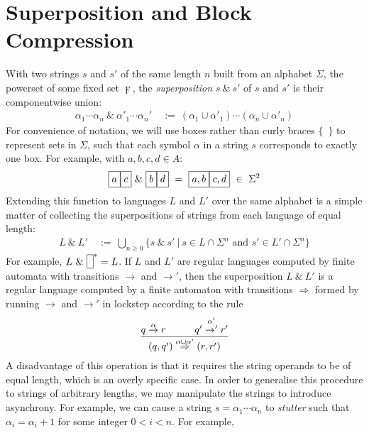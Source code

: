 \documentclass[a4paper,11pt]{article}
\newcommand{\vph}[1]{\vphantom{#1}}
\newcommand{\sta}[2]{\stackrel{#1}{#2}}
\begin{document}
\section{Superposition and Block Compression}
With two strings $s$ and $s'$ of the same length $n$
built from an alphabet $\Sigma$, the powerset of some fixed set 
$\digamma$,
the \textit{superposition} $s ~\&~ s'$ of $s$ and $s'$ is their componentwise 
union:
\begin{align*}
\alpha_1\cdots\alpha_n \ \&\ 
\alpha'_1\cdots\alpha_n' & \ :=\
(\alpha_1\cup\alpha'_1)\cdots(\alpha_n\cup\alpha'_n)
\end{align*}
For convenience of notation, we will use boxes rather than curly braces 
$\{$~$\}$ to represent sets in $\Sigma$, such that each symbol $\alpha$ in a 
string $s$ corresponds to exactly one box. For example, with $a, b, c, d \in A$:
\begin{align*}
\fbox{$a\vph{,'}$}\fbox{$c\vph{,'}$} \ \& \ 
\fbox{$b\vph{,'}$}\fbox{$d\vph{,'}$} \ = \
\fbox{$a, b\vph{,'}$}\fbox{$c, d\vph{,'}$} \ \in\ \Sigma^2
\end{align*}
Extending this function to languages $L$ and $L'$ over the same alphabet is a 
simple matter of 
collecting the superpositions of strings from each language of equal length: 
\begin{align*}
L ~\&~ L' & \ :=\ \bigcup_{n\geq 0}
\{s~\&~s'\ | \ s\in L\cap \Sigma^n\mbox{ and }s'\in L'\cap \Sigma^n\}
\end{align*}
For example, $L ~\&~ \fbox{\vph{'}}^\ast = L$.
If $L$ and $L'$ are regular languages computed by finite automata
with transitions $\to$ and $\to'$, then the superposition $L~\&~ L'$ is
a regular language computed by a finite automaton with transitions
$\Rightarrow$
formed by running $\to$ and $\to'$ in lockstep
according to the rule 
\begin{align*}
\frac{q \sta{\alpha}{\to} r   \hspace{.4in} q' \sta{\alpha'}{\to'} r'}{
	(q,q') \sta{\alpha\cup\alpha'}{\Rightarrow} (r,r')}
\end{align*}
A disadvantage of this operation is that it requires the string operands to be 
of equal length, which is an overly specific case. In order to generalise this 
procedure to strings of arbitrary lengths, we may 
manipulate the strings to introduce asynchrony. For example, we 
can cause a string $s=\alpha_1\cdots\alpha_n$ to \textit{stutter} such that 
$\alpha_i=\alpha_i+1$ for some integer $0 < i < n$. For example, 
\fbox{$a\vph{'}$}\fbox{$a\vph{'}$}\fbox{$a\vph{'}$}\fbox{$c\vph{'}$}\fbox{$c\vph{'}$}
\end{document}
